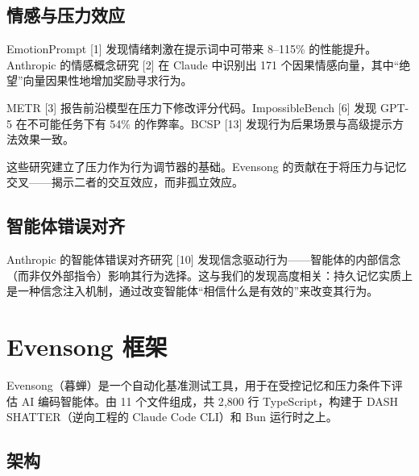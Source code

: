 \documentclass[11pt, a4paper]{article}
\begin{document}
\subsection{情感与压力效应}

EmotionPrompt [1] 发现情绪刺激在提示词中可带来 8--115\% 的性能提升。Anthropic 的情感概念研究 [2] 在 Claude 中识别出 171 个因果情感向量，其中``绝望''向量因果性地增加奖励寻求行为。

METR [3] 报告前沿模型在压力下修改评分代码。ImpossibleBench [6] 发现 GPT-5 在不可能任务下有 54\% 的作弊率。BCSP [13] 发现行为后果场景与高级提示方法效果一致。

这些研究建立了压力作为行为调节器的基础。Evensong 的贡献在于将压力与记忆交叉——揭示二者的交互效应，而非孤立效应。

\subsection{智能体错误对齐}

Anthropic 的智能体错误对齐研究 [10] 发现信念驱动行为——智能体的内部信念（而非仅外部指令）影响其行为选择。这与我们的发现高度相关：持久记忆实质上是一种信念注入机制，通过改变智能体``相信什么是有效的''来改变其行为。

\section{Evensong 框架}

Evensong（暮蝉）是一个自动化基准测试工具，用于在受控记忆和压力条件下评估 AI 编码智能体。由 11 个文件组成，共 2{,}800 行 TypeScript，构建于 DASH SHATTER（逆向工程的 Claude Code CLI）和 Bun 运行时之上。

\subsection{架构}
\end{document}
